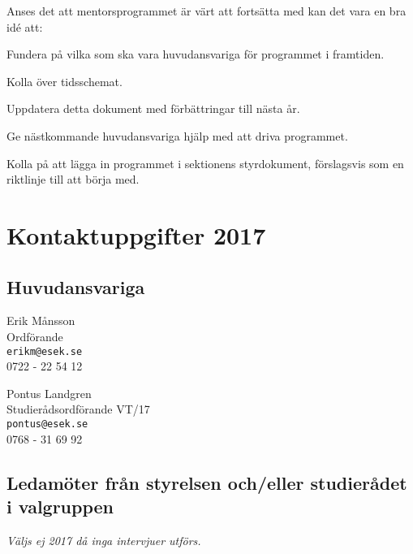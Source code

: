 \documentclass[10pt]{article}
\def\year{2017}
\begin{document}
    Anses det att mentorsprogrammet är värt att fortsätta med kan det vara en bra idé att:
    \begin{dashlist}
        \item Fundera på vilka som ska vara huvudansvariga för programmet i framtiden.
        \item Kolla över tidsschemat.
        \item Uppdatera detta dokument med förbättringar till nästa år.
        \item Ge nästkommande huvudansvariga hjälp med att driva programmet.
        \item Kolla på att lägga in programmet i sektionens styrdokument, förslagsvis som en riktlinje till att börja med.
    \end{dashlist}

    \section{Kontaktuppgifter \year}
    \subsection*{Huvudansvariga}
    Erik Månsson\\
    Ordförande\\
    \texttt{erikm@esek.se}\\
    0722 - 22 54 12

    Pontus Landgren\\
    Studierådsordförande VT/17\\
    \texttt{pontus@esek.se}\\
    0768 - 31 69 92

    \subsection*{Ledamöter från styrelsen och/eller studierådet i valgruppen}
    \emph{Väljs ej 2017 då inga intervjuer utförs.}
\end{document}
